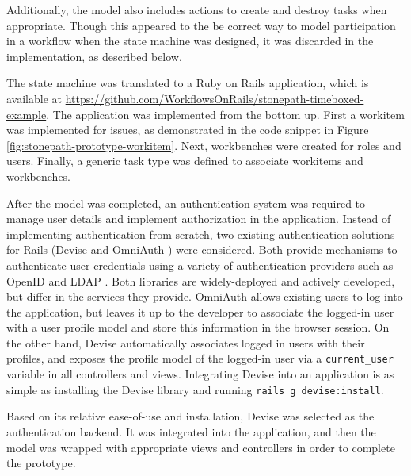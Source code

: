 \documentclass[document.tex]{subfiles}
\begin{document}
Additionally, the model also includes actions to create and destroy tasks when appropriate. Though this appeared to the be correct way to model participation in a workflow when the state machine was designed, it was discarded in the implementation, as described below.

The state machine was translated to a Ruby on Rails application, which is available at \url{https://github.com/WorkflowsOnRails/stonepath-timeboxed-example}. The application was implemented from the bottom up. First a workitem was implemented for issues, as demonstrated in the code snippet in Figure \ref{fig:stonepath-prototype-workitem}. Next, workbenches were created for roles and users. Finally, a generic task type was defined to associate workitems and workbenches.

After the model was completed, an authentication system was required to manage user details and implement authorization in the application. Instead of implementing authentication from scratch, two existing authentication solutions for Rails (Devise \cite{devise} and OmniAuth \cite{omniauth}) were considered. Both provide mechanisms to authenticate user credentials using a variety of authentication providers such as OpenID \cite{devise-openid} and LDAP \cite{omniauth-ldap}. Both libraries are widely-deployed and actively developed, but differ in the services they provide. OmniAuth allows existing users to log into the application, but leaves it up to the developer to associate the logged-in user with a user profile model and store this information in the browser session. On the other hand, Devise automatically associates logged in users with their profiles, and exposes the profile model of the logged-in user via a \verb!current_user! variable in all controllers and views. Integrating Devise into an application is as simple as installing the Devise library and running {\tt rails g devise:install}.

Based on its relative ease-of-use and installation, Devise was selected as the authentication backend. It was integrated into the application, and then the model was wrapped with appropriate views and controllers in order to complete the prototype.
\end{document}

